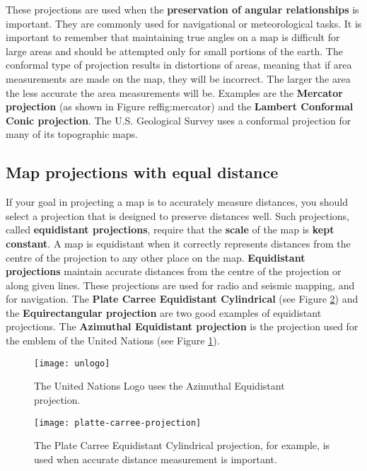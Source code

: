 These projections are used when the \textbf{preservation of angular
relationships} is
important. They are commonly used for navigational or meteorological tasks.
It is important to remember that maintaining true angles on a map is
difficult for large areas and should be attempted only for small portions of
the earth.  The conformal type of projection results in distortions of areas,
meaning that if area measurements are made on the map, they will be
incorrect. The larger the area the less accurate the area measurements will
be. Examples are the \textbf{Mercator projection} (as shown in Figure
ref{fig:mercator}) and the \textbf{Lambert Conformal Conic projection}. The
U.S. Geological Survey uses a conformal projection for many of its
topographic maps.

\subsection{Map projections with equal distance}

If your goal in projecting a map is to accurately measure distances, you
should select a projection that is designed to preserve distances well. Such
projections, called \textbf{equidistant projections}, require that the
\textbf{scale} of the map is \textbf{kept constant}. A map is equidistant
when it correctly represents
distances from the centre of the projection to any other place on the map.
\textbf{Equidistant projections} maintain accurate distances from the centre of the
projection or along given lines. These projections are used for radio and
seismic mapping, and for navigation. The \textbf{Plate Carree Equidistant
Cylindrical} (see Figure \ref{fig:platte}) and the \textbf{Equirectangular
projection} are two good examples of equidistant projections. The
\textbf{Azimuthal Equidistant projection} is
the projection used for the emblem of the United Nations (see Figure
\ref{fig:uno}).

\begin{figure}[ht]
   \begin{center}
   \caption{The United Nations Logo uses the Azimuthal Equidistant
projection.}
\label{fig:uno}\smallskip
   \texttt{[image: unlogo]}
\end{center}
\end{figure}

\begin{figure}[ht]
   \begin{center}
   \caption{The Plate Carree Equidistant Cylindrical projection, for example,
is used when accurate distance measurement is important.}
\label{fig:platte}\smallskip
   \texttt{[image: platte-carree-projection]}
\end{center}
\end{figure}

